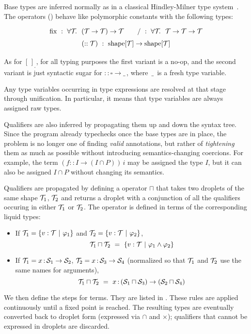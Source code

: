 Base types are inferred normally as in a classical Hindley-Milner type system~\cite{78/Milner}.
The operators () behave like polymorphic
constants with the following types:
\[\renewcommand\arraystretch{1.5}
  \begin{array}{c}
    {\fix} ~:~ \forallT ~(\T\to\T)\to\T \qquad 
    {/} ~:~ \forallT ~\T\to\T\to\T \\
    (::\T) ~:~ \mathrm{shape}[\T]\to\mathrm{shape}[\T]
  \end{array}\]

As for $[\,]_{_\square}$, for all typing purposes the first variant is a no-op, and the second variant
is just syntactic sugar for $:: \square\to\_$\,,
where \,$\_$\, is a fresh type variable.

Any type variables occurring in type expressions are resolved at that
stage through unification. In particular, it means that type variables are always assigned raw types.

Qualifiers are also inferred by propagating them up and down the syntax tree.
Since the program already typechecks once the base types are in place, the problem is no longer
one of finding {\em valid} annotations, but rather of {\em tightening} them as much as possible
without introducing semantics-changing coercions. For example, the term $(f :: I\to(I\cap P))\,i$ may
be assigned the type $I$, but it can also be assigned $I\cap P$ without changing its semantics.

Qualifiers are propagated by defining a  operator $\sqcap$ that
takes two droplets of the same shape $\mathcal{T}_1$, $\mathcal{T}_2$ and returns a droplet with a conjunction of all the qualifiers
occuring in either $\mathcal{T}_1$ or $\mathcal{T}_2$. The operator is defined in terms of the corresponding liquid types:
\begin{itemize}
  \item If $\mathcal{T}_1=\{v:\mathcal{T} ~|~ \varphi_1\}$ and $\mathcal{T}_2=\{v:\mathcal{T} ~|~ \varphi_2\}$,
	\[\mathcal{T}_1\sqcap\mathcal{T}_2 ~=~ \{v:\mathcal{T} ~|~ \varphi_1\land\varphi_2\}\]
  \item If $\mathcal{T}_1=x{\,:\,}\mathcal{S}_1\to\mathcal{S}_2$, $\mathcal{T}_2=x{\,:\,}\mathcal{S}_3\to\mathcal{S}_4$ (normalized so that $\mathcal{T}_1$ and $\mathcal{T}_2$ use the same names for arguments),
    \[\mathcal{T}_1\sqcap\mathcal{T}_2 ~=~ x{\,:\,}(\mathcal{S}_1\sqcap\mathcal{S}_3)\to(\mathcal{S}_2\sqcap\mathcal{S}_4)\]
\end{itemize}

We then define the  steps for terms. They are listed in .
These rules are applied continuously until a fixed point is reached.
The resulting types are eventually converted back to droplet form (expressed via $\cap$ and $\times$);
qualifiers that cannot be expressed in droplets are discarded.

